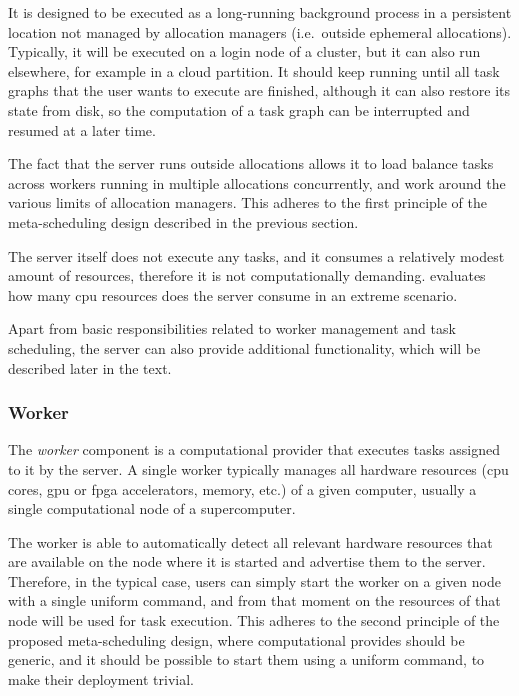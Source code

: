It is designed to be executed as a long-running background process in a persistent location not
managed by allocation managers (i.e.\ outside ephemeral allocations). Typically, it will be
executed on a login node of a cluster, but it can also run elsewhere, for example in a cloud
partition. It should keep running until all task graphs that the user wants to execute are
finished, although it can also restore its state from disk, so the computation of a task graph can
be interrupted and resumed at a later time.

The fact that the server runs outside allocations allows it to load balance tasks across workers
running in multiple allocations concurrently, and work around the various limits of allocation
managers. This adheres to the first principle of the meta-scheduling design described in the
previous section.

The \hq{} server itself does not execute any tasks, and it consumes a relatively
modest amount of resources, therefore it is not computationally demanding. 
evaluates how many \gls{cpu} resources does the server consume in an extreme
scenario.

Apart from basic responsibilities related to worker management and task scheduling, the server can
also provide additional functionality, which will be described later in the text.

\subsubsection*{Worker}
The \emph{worker} component is a computational provider that executes tasks assigned to
it by the server. A single worker typically manages all hardware resources (\gls{cpu}
cores, \gls{gpu} or \gls{fpga} accelerators, memory, etc.) of a given
computer, usually a single computational node of a supercomputer.

The worker is able to automatically detect all relevant hardware resources that are available on
the node where it is started and advertise them to the server. Therefore, in the typical case,
users can simply start the worker on a given node with a single uniform command, and from that
moment on the resources of that node will be used for task execution. This adheres to the second
principle of the proposed meta-scheduling design, where computational provides should be generic,
and it should be possible to start them using a uniform command, to make their deployment trivial.

